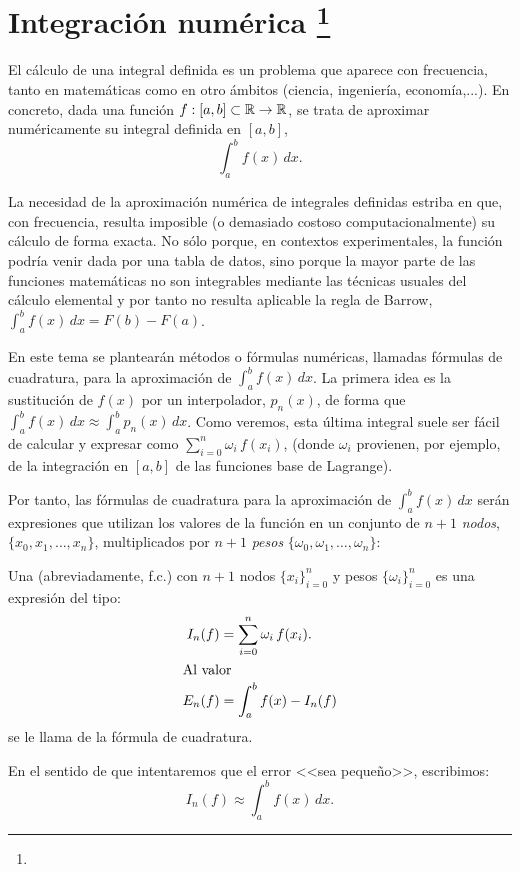 \chapter[Integración numérica]{Integración numérica%
\footnote{\licenseInfo}}
\label{cha:integracion-numerica}

El cálculo de una integral definida es un problema que aparece con
frecuencia, tanto en matemáticas como en otro ámbitos (ciencia,
ingeniería, economía,...). En concreto, dada una función
$f:[a,b]\subset\operatorname{{\mathbb R}}\to\operatorname{{\mathbb R}}$, se trata de aproximar numéricamente su
integral definida en $[a,b]$,
\begin{equation*}
  \int_a^bf(x)\,dx.
\end{equation*}

La necesidad de la aproximación numérica de integrales definidas
estriba en que, con frecuencia, resulta imposible (o demasiado costoso
computacionalmente) su cálculo de forma exacta. No sólo porque, en
contextos experimentales, la función podría venir dada por una tabla
de datos, sino porque la mayor parte de las funciones matemáticas no
son integrables mediante las técnicas usuales del cálculo elemental
y por tanto no resulta aplicable la regla de Barrow, $\int_a^b f(x)\,
dx=F(b)-F(a)$.

En este tema se plantearán métodos o fórmulas numéricas, llamadas
fórmulas de cuadratura, para la aproximación de $\int_a^b f(x)\,
dx$. La primera idea es la sustitución de $f(x)$ por un interpolador,
$p_n(x)$, de forma que $\int_a^bf(x)\,dx \approx \int_a^b p_n(x)\,
dx$. Como veremos, esta última integral suele ser fácil de calcular y
expresar como $\sum_{i=0}^n \omega_i \, f(x_i)$, (donde $\omega_i$
provienen, por ejemplo, de la integración en $[a,b]$ de las funciones
base de Lagrange).


Por tanto, las fórmulas de cuadratura para la aproximación de
$\int_a^b f(x)\, dx$ serán expresiones que utilizan los valores de la
función en un conjunto de $n+1$ \emph{nodos}, $\{x_0,x_1,\dots,x_n\}$,
multiplicados por $n+1$ \emph{pesos}
$\{\omega_0,\omega_1,\dots,\omega_n\}$:
\begin{definition}
  \label{def:formula-cuadratura}
  Una  (abreviadamente, f.c.) con
  $n+1$ nodos $\{x_i\}_{i=0}^n$ y pesos $\{\omega_i\}_{i=0}^n$ es una
  expresión del tipo:
  \begin{align}
    \label{eq:f.cuadratura}
    I_n(f)&=\sum_{i=0}^n \omega_i \, f(x_i).
    \\
    \intertext{Al valor}
    \notag
    E_n(f) &= \int_a^b f(x) - I_n(f) 
  \end{align}
  se le llama  de la fórmula de cuadratura. 
\end{definition}
En el sentido de que intentaremos que el error <<sea pequeño>>, escribimos:
\begin{equation*}
  I_n(f) \approx \int_a^b f(x)\, dx.
\end{equation*}

